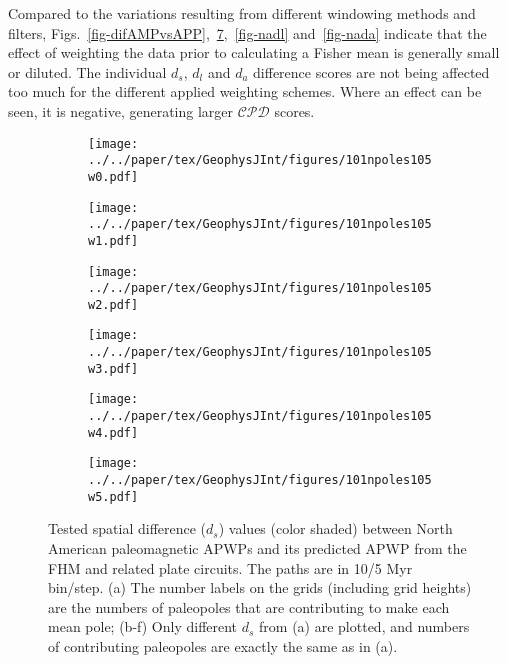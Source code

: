 Compared to the variations resulting from different windowing methods and
filters, Figs.~\ref{fig-difAMPvsAPP},~\ref{fig-nads},~\ref{fig-nadl}
and~\ref{fig-nada} indicate that the effect of weighting the data prior to
calculating a Fisher mean is generally small or diluted. The individual $d_s$,
$d_l$ and $d_a$ difference scores are not being affected too much for the
different applied weighting schemes. Where an effect can be seen, it is
negative, generating larger $\mathcal{CPD}$ scores.

\begin{figure}[!ht]
  \captionsetup[subfigure]{singlelinecheck=off,justification=raggedright,aboveskip=-6pt,belowskip=-6pt}
  \centering
  \begin{subfigure}{.495\textwidth}
    \texttt{[image: ../../paper/tex/GeophysJInt/figures/101npoles105w0.pdf]}
    \caption{}\label{fig-na-dsw0}
  \end{subfigure}
  \vspace{.1em}
  \begin{subfigure}{.495\textwidth}
    \texttt{[image: ../../paper/tex/GeophysJInt/figures/101npoles105w1.pdf]}
    \caption{}\label{fig-na-dsw1}
  \end{subfigure}
  \vspace{.1em}
  \begin{subfigure}{.495\textwidth}
    \texttt{[image: ../../paper/tex/GeophysJInt/figures/101npoles105w2.pdf]}
    \caption{}\label{fig-na-dsw2}
  \end{subfigure}
  \vspace{.1em}
  \begin{subfigure}{.495\textwidth}
    \texttt{[image: ../../paper/tex/GeophysJInt/figures/101npoles105w3.pdf]}
    \caption{}\label{fig-na-dsw3}
  \end{subfigure}
  \vspace{.1em}
  \begin{subfigure}{.495\textwidth}
    \texttt{[image: ../../paper/tex/GeophysJInt/figures/101npoles105w4.pdf]}
    \caption{}\label{fig-na-dsw4}
  \end{subfigure}
  \vspace{.1em}
  \begin{subfigure}{.495\textwidth}
    \texttt{[image: ../../paper/tex/GeophysJInt/figures/101npoles105w5.pdf]}
    \caption{}\label{fig-na-dsw5}
  \end{subfigure}
  \caption[$d_s$ of each pair of poles for North American 10/5 Myr APWPs]{Tested
    spatial difference ($d_s$) values (color shaded) between North American
    paleomagnetic APWPs and its predicted APWP from the FHM and related plate
    circuits. The paths are in 10/5 Myr bin/step. (a) The number labels on the
    grids (including grid heights) are the numbers of paleopoles that are
    contributing to make each mean pole; (b-f) Only different $d_s$ from (a) are
    plotted, and numbers of contributing paleopoles are exactly the same as in
    (a).}\label{fig-nads}
\end{figure}

